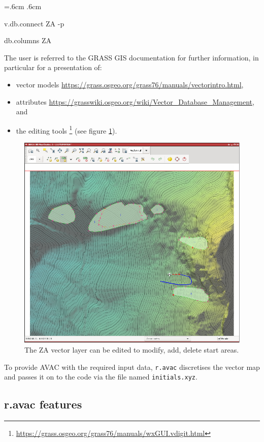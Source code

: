 \documentclass[12pt,oneside]{paper}
\newenvironment{code}{%
\vspace{2mm}%
\hangindent=.6cm%
\parindent.6cm%
\ttfamily%
\color{gris.3}%
}{
\vspace{2mm}%
}
\begin{document}
\begin{code}
v.db.connect ZA -p

db.columns ZA
\end{code}

The user is referred to the GRASS GIS documentation for further information, in particular for a presentation of:
 \begin{itemize}
 \item  vector models \href{https://grass.osgeo.org/grass76/manuals/vectorintro.html}{https://grass.osgeo.org/grass76/manuals/vectorintro.html}, 
  \item attributes \href{https://grasswiki.osgeo.org/wiki/Vector\_Database\_Management}{https://grasswiki.osgeo.org/wiki/Vector\_Database\_Management}, and
  \item the editing tools \footnote{\href{https://grass.osgeo.org/grass76/manuals/wxGUI.vdigit.html}{https://grass.osgeo.org/grass76/manuals/wxGUI.vdigit.html}}  (see figure \ref{fig:vector}).
\end{itemize}

\begin{figure}[!h]
\begin{center}
\includegraphics[width=0.70\hsize]{capture2.eps}
\caption{The ZA vector layer can be edited to modify, add, delete start areas.}
\label{fig:vector}
\end{center}
\end{figure}

To provide AVAC with the required input data,  \verb+r.avac+ discretises the vector map and passes it on to the code via the file named \texttt{initials.xyz}.

\subsection{r.avac features}
\end{document}
